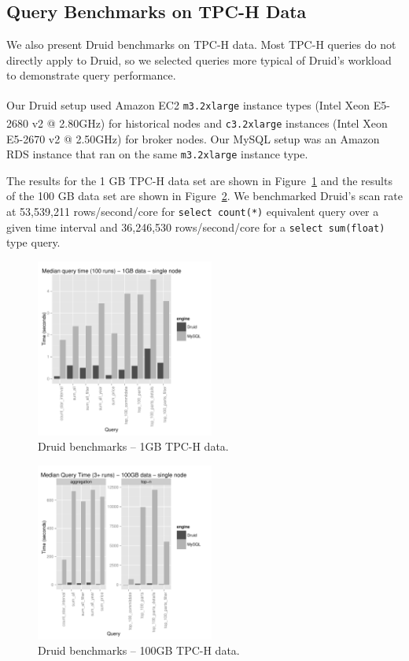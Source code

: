 \documentclass{vldb}
\begin{document}
\subsection{Query Benchmarks on TPC-H Data}
We also present Druid benchmarks on TPC-H data.  Most TPC-H queries do not
directly apply to Druid, so we selected queries more typical of Druid's
workload to demonstrate query performance. 

Our Druid setup used Amazon EC2 \texttt{m3.2xlarge} instance types
(Intel\textsuperscript{\textregistered} Xeon\textsuperscript{\textregistered}
E5-2680 v2 @ 2.80GHz) for historical nodes and \texttt{c3.2xlarge} instances
(Intel\textsuperscript{\textregistered} Xeon\textsuperscript{\textregistered}
E5-2670 v2 @ 2.50GHz) for broker nodes. Our MySQL setup was an Amazon RDS
instance that ran on the same \texttt{m3.2xlarge} instance type.

The results for the 1 GB TPC-H data set are shown in Figure~\ref{fig:tpch_1gb}
and the results of the 100 GB data set are shown in
Figure~\ref{fig:tpch_100gb}. We benchmarked Druid's scan rate at 53,539,211
rows/second/core for \texttt{select count(*)} equivalent query over a given
time interval and 36,246,530 rows/second/core for a \texttt{select sum(float)}
type query.

\begin{figure}
\centering
\includegraphics[width = 2.3in]{tpch_1gb}
\caption{Druid benchmarks -- 1GB TPC-H data.}
\label{fig:tpch_1gb}
\end{figure}

\begin{figure}
\centering
\includegraphics[width = 2.3in]{tpch_100gb}
\caption{Druid benchmarks -- 100GB TPC-H data.}
\label{fig:tpch_100gb}
\end{figure}
\end{document}
